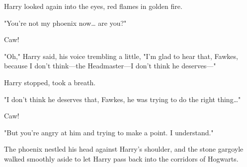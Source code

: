 Harry looked again into the eyes, red flames in golden fire.

"You're not my phoenix now{\ldots} are you?"

Caw!

"Oh," Harry said, his voice trembling a little, "I'm glad to hear that, Fawkes,
because I don't think---the Headmaster---I don't think he deserves---"

Harry stopped, took a breath.

"I don't think he deserves that, Fawkes, he was trying to do the right
thing{\ldots}"

Caw!

"But you're angry at him and trying to make a point. I understand."

The phoenix nestled his head against Harry's shoulder, and the stone gargoyle
walked smoothly aside to let Harry pass back into the corridors of Hogwarts.
